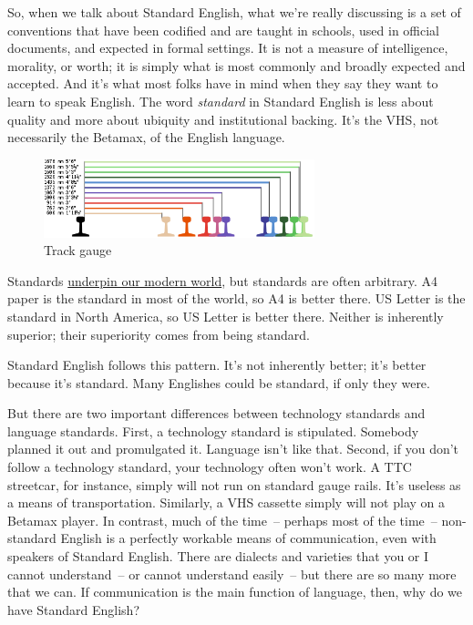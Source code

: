 So, when we talk about Standard English, what we're really discussing is a set of conventions that have been codified and are taught in schools, used in official documents, and expected in formal settings. It is not a measure of intelligence, morality, or worth; it is simply what is most commonly and broadly expected and accepted. And it's what most folks have in mind when they say they want to learn to speak English. The word \textit{standard} in Standard English is less about quality and more about ubiquity and institutional backing. It's the VHS, not necessarily the Betamax, of the English language.

\begin{figure}
\centering
\includegraphics[width=0.7\textwidth]{figures/Track_gauge.svg.png}
\caption{Track gauge}
\label{fig:rail}
\end{figure}

Standards \href{https://www.wired.com/2002/01/standards-2/}{underpin our modern world}, but standards are often arbitrary. A4 paper is the standard in most of the world, so A4 is better there. US Letter is the standard in North America, so US Letter is better there. Neither is inherently superior; their superiority comes from being standard.

Standard English follows this pattern. It's not inherently better; it's better because it's standard. Many Englishes could be standard, if only they were.

But there are two important differences between technology standards and language standards. First, a technology standard is stipulated. Somebody planned it out and promulgated it. Language isn't like that. Second, if you don't follow a technology standard, your technology often won't work. A TTC streetcar, for instance, simply will not run on standard gauge rails. It's useless as a means of transportation. Similarly, a VHS cassette simply will not play on a Betamax player. In contrast, much of the time~-- perhaps most of the time~-- non-standard English is a perfectly workable means of communication, even with speakers of Standard English. There are dialects and varieties that you or I cannot understand~-- or cannot understand easily~-- but there are so many more that we can. If communication is the main function of language, then, why do we have Standard English?

